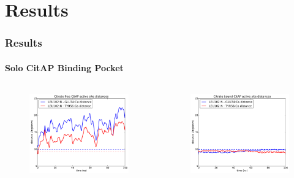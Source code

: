 \documentclass[english]{beamer}
\begin{document}

\section{Results}

\begin{frame}
    \frametitle{Results}
    \framesubtitle{Solo CitAP Binding Pocket}

    \begin{columns}[t]
        \begin{figure}
            \includegraphics[width=1.0\textwidth]{figures/CitAP_opening/CitAP_dist_free.pdf}
        \end{figure}       

        \begin{figure}
            \includegraphics[width=1.0\textwidth]{figures/CitAP_opening/CitAP_dist_bound.pdf}
        \end{figure}        


\end{columns}
\end{frame}
\end{document}
